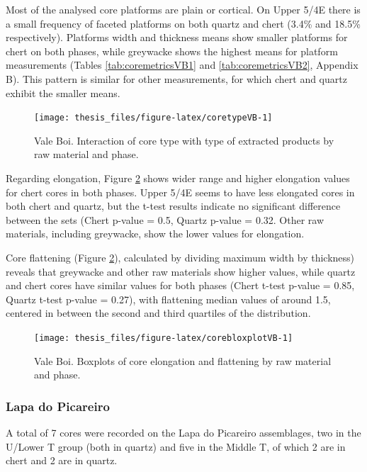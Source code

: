 \documentclass[12pt,twoside]{reedthesis}
\begin{document}
Most of the analysed core platforms are plain or cortical. On Upper 5/4E there is a small frequency of faceted platforms on both quartz and chert (3.4\% and 18.5\% respectively). Platforms width and thickness means show smaller platforms for chert on both phases, while greywacke shows the highest means for platform measurements (Tables \ref{tab:coremetricsVB1} and \ref{tab:coremetricsVB2}, Appendix B). This pattern is similar for other measurements, for which chert and quartz exhibit the smaller means.
\begin{figure}[H]

{\centering \texttt{[image: thesis\_files/figure-latex/coretypeVB-1]} 

}

\caption{Vale Boi. Interaction of core type with type of extracted products by raw material and phase.}\label{fig:coretypeVB}
\end{figure}
Regarding elongation, Figure \ref{fig:corebloxplotVB} shows wider range and higher elongation values for chert cores in both phases. Upper 5/4E seems to have less elongated cores in both chert and quartz, but the t-test results indicate no significant difference between the sets (Chert p-value = 0.5, Quartz p-value = 0.32. Other raw materials, including greywacke, show the lower values for elongation.

Core flattening (Figure \ref{fig:corebloxplotVB}), calculated by dividing maximum width by thickness) reveals that greywacke and other raw materials show higher values, while quartz and chert cores have similar values for both phases (Chert t-test p-value = 0.85, Quartz t-test p-value = 0.27), with flattening median values of around 1.5, centered in between the second and third quartiles of the distribution.
\begin{figure}

{\centering \texttt{[image: thesis\_files/figure-latex/corebloxplotVB-1]} 

}

\caption{Vale Boi. Boxplots of core elongation and flattening by raw material and phase.}\label{fig:corebloxplotVB}
\end{figure}
\hypertarget{lapa-do-picareiro-4}{%
\subsubsection{Lapa do Picareiro}\label{lapa-do-picareiro-4}}

A total of 7 cores were recorded on the Lapa do Picareiro assemblages, two in the U/Lower T group (both in quartz) and five in the Middle T, of which 2 are in chert and 2 are in quartz.
\end{document}
